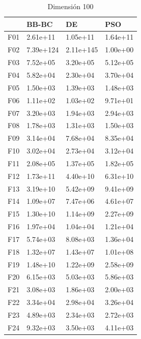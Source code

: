\begin{table}[H]
\begin{minipage}{.5\linewidth}
    \end{minipage}%
    \begin{minipage}{.5\linewidth}
      \centering
      \caption{Dimensión 100}
      \begin{tabular}{llll}
        \toprule
        {} &      BB-BC &         DE &       PSO \\
        \midrule
        F01  &   2.61e+11 &   1.05e+11 &  1.64e+11 \\
        F02  &  7.39e+124 &  2.11e+145 &  1.00e+00 \\
        F03  &   7.52e+05 &   3.20e+05 &  5.12e+05 \\
        F04  &   5.82e+04 &   2.30e+04 &  3.70e+04 \\
        F05  &   1.50e+03 &   1.39e+03 &  1.48e+03 \\
        F06  &   1.11e+02 &   1.03e+02 &  9.71e+01 \\
        F07  &   3.20e+03 &   1.94e+03 &  2.94e+03 \\
        F08  &   1.78e+03 &   1.31e+03 &  1.50e+03 \\
        F09  &   3.14e+04 &   7.68e+04 &  8.35e+04 \\
        F10  &   3.02e+04 &   2.73e+04 &  3.12e+04 \\
        F11  &   2.08e+05 &   1.37e+05 &  1.82e+05 \\
        F12  &   1.73e+11 &   4.40e+10 &  6.31e+10 \\
        F13  &   3.19e+10 &   5.42e+09 &  9.41e+09 \\
        F14  &   1.09e+07 &   7.47e+06 &  4.61e+07 \\
        F15  &   1.30e+10 &   1.14e+09 &  2.27e+09 \\
        F16  &   1.97e+04 &   1.04e+04 &  1.21e+04 \\
        F17  &   5.74e+03 &   8.08e+03 &  1.36e+04 \\
        F18  &   1.32e+07 &   1.43e+07 &  1.01e+08 \\
        F19  &   1.48e+10 &   1.22e+09 &  2.58e+09 \\
        F20  &   6.15e+03 &   5.03e+03 &  5.86e+03 \\
        F21  &   3.08e+03 &   1.86e+03 &  2.00e+03 \\
        F22  &   3.34e+04 &   2.98e+04 &  3.26e+04 \\
        F23  &   4.89e+03 &   2.34e+03 &  2.72e+03 \\
        F24  &   9.32e+03 &   3.50e+03 &  4.11e+03 \\

\end{tabular}
\end{minipage}
\end{table}
